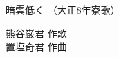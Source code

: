 \documentclass[10pt,b5j]{tarticle} %
\begin{document}
\begin{minipage}[c]{0.7\hsize} %
    \begin{center}
        {\LARGE
            暗雲低く %
        }
        {\small 
            （大正8年寮歌） %
        }
    \end{center}
\end{minipage}
\begin{minipage}[c]{0.3\hsize} %
    \begin{flushright} %
        熊谷巌君 作歌\\置塩奇君 作曲 %
    \end{flushright}
\end{minipage}
\end{document}
